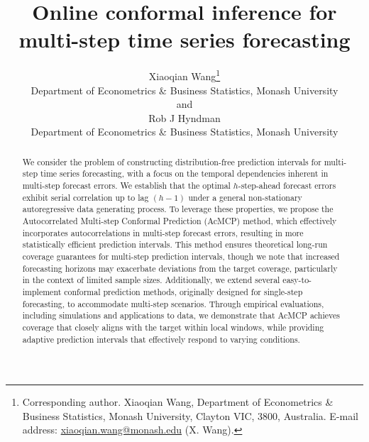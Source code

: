 \documentclass[
  11pt,
  12pt]{article}
\theoremstyle{plain}
\theoremstyle{remark}
\begin{document}
\def\spacingset#1{\renewcommand{\baselinestretch}%
{#1}\small\normalsize} \spacingset{1}

\renewcommand*{\arraystretch}{0.5} %


\title{\bf Online conformal inference for multi-step time series
forecasting}
\author{
Xiaoqian Wang\thanks{Corresponding author. Xiaoqian Wang, Department of
Econometrics \& Business Statistics, Monash University, Clayton VIC,
3800, Australia. E-mail address:
\href{mailto:xiaoqian.wang@monash.edu}{xiaoqian.wang@monash.edu} (X.
Wang).} \vspace{0.2em}\\
Department of Econometrics \& Business Statistics, Monash
University \vspace{0.2em}\\
and \vspace{0.2em}\\Rob J Hyndman \vspace{0.2em}\\
Department of Econometrics \& Business Statistics, Monash
University \vspace{0.2em}\\
}
\maketitle

\bigskip
\bigskip
\begin{abstract}
We consider the problem of constructing distribution-free prediction
intervals for multi-step time series forecasting, with a focus on the
temporal dependencies inherent in multi-step forecast errors. We
establish that the optimal \(h\)-step-ahead forecast errors exhibit
serial correlation up to lag \((h-1)\) under a general non-stationary
autoregressive data generating process. To leverage these properties, we
propose the Autocorrelated Multi-step Conformal Prediction (AcMCP)
method, which effectively incorporates autocorrelations in multi-step
forecast errors, resulting in more statistically efficient prediction
intervals. This method ensures theoretical long-run coverage guarantees
for multi-step prediction intervals, though we note that increased
forecasting horizons may exacerbate deviations from the target coverage,
particularly in the context of limited sample sizes. Additionally, we
extend several easy-to-implement conformal prediction methods,
originally designed for single-step forecasting, to accommodate
multi-step scenarios. Through empirical evaluations, including
simulations and applications to data, we demonstrate that AcMCP achieves
coverage that closely aligns with the target within local windows, while
providing adaptive prediction intervals that effectively respond to
varying conditions.
\end{abstract}
\end{document}
